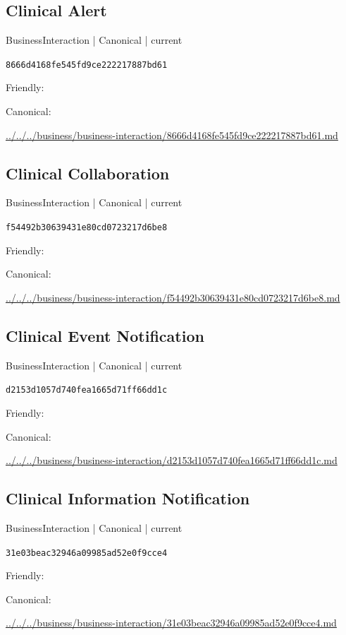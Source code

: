 \documentclass[10pt,a4paper]{article}
\begin{document}
\subsection*{Clinical Alert}
{\small BusinessInteraction | Canonical | current}\par
\texttt{8666d4168fe545fd9ce222217887bd61}\par
Friendly: \par
Canonical: \par
{\footnotesize\url{../../../business/business-interaction/8666d4168fe545fd9ce222217887bd61.md}}\par
\subsection*{Clinical Collaboration}
{\small BusinessInteraction | Canonical | current}\par
\texttt{f54492b30639431e80cd0723217d6be8}\par
Friendly: \par
Canonical: \par
{\footnotesize\url{../../../business/business-interaction/f54492b30639431e80cd0723217d6be8.md}}\par
\subsection*{Clinical Event Notification}
{\small BusinessInteraction | Canonical | current}\par
\texttt{d2153d1057d740fea1665d71ff66dd1c}\par
Friendly: \par
Canonical: \par
{\footnotesize\url{../../../business/business-interaction/d2153d1057d740fea1665d71ff66dd1c.md}}\par
\subsection*{Clinical Information Notification}
{\small BusinessInteraction | Canonical | current}\par
\texttt{31e03beac32946a09985ad52e0f9cce4}\par
Friendly: \par
Canonical: \par
{\footnotesize\url{../../../business/business-interaction/31e03beac32946a09985ad52e0f9cce4.md}}\par
\end{document}
